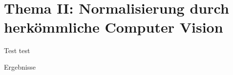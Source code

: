 \section{Thema II: Normalisierung durch herkömmliche Computer Vision}

\begin{frame}{Test}
    test
\end{frame}

\begin{frame}{Ergebnisse}
    
\end{frame}

